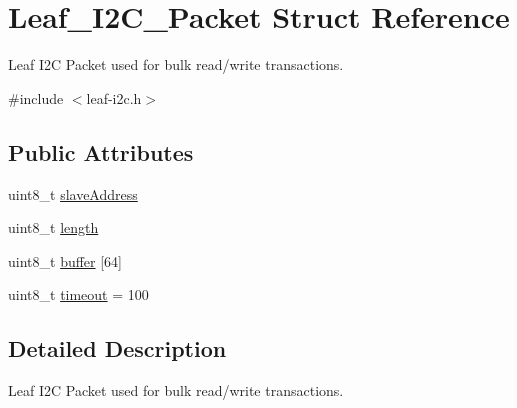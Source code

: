 \hypertarget{structLeaf__I2C__Packet}{\section{Leaf\-\_\-\-I2\-C\-\_\-\-Packet Struct Reference}
\label{structLeaf__I2C__Packet}
}


Leaf I2\-C Packet used for bulk read/write transactions.  




{\ttfamily \#include $<$leaf-\/i2c.\-h$>$}

\subsection*{Public Attributes}
\begin{DoxyCompactItemize}
\item 
uint8\-\_\-t \hyperlink{structLeaf__I2C__Packet_abffc930d74df9162efb359f1e56b7c4b}{slave\-Address}
\item 
uint8\-\_\-t \hyperlink{structLeaf__I2C__Packet_a0fb8ef2f47ba136d28858a8c5e3e045c}{length}
\item 
uint8\-\_\-t \hyperlink{structLeaf__I2C__Packet_a78fe04fe85d9b756b9fbe76d07e20b2d}{buffer} \mbox{[}64\mbox{]}
\item 
uint8\-\_\-t \hyperlink{structLeaf__I2C__Packet_a0d95e8d6677db64141e9940cb9a0d4a4}{timeout} = 100
\end{DoxyCompactItemize}


\subsection{Detailed Description}
Leaf I2\-C Packet used for bulk read/write transactions. 

